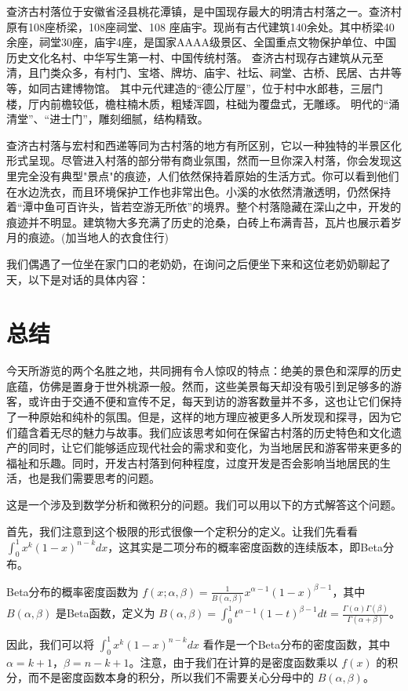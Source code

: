 \documentclass[a4paper,11pt,UTF8]{article}
\begin{document}
查济古村落位于安徽省泾县桃花潭镇，是中国现存最大的明清古村落之一。查济村原有108座桥梁，108座祠堂、108 座庙宇。现尚有古代建筑140余处。其中桥梁40余座，祠堂30座，庙宇4座，是国家AAAA级景区、全国重点文物保护单位、中国历史文化名村、中华写生第一村、中国传统村落。 查济古村现存古建筑从元至清，且门类众多，有村门、宝塔、牌坊、庙宇、社坛、祠堂、古桥、民居、古井等等，如同古建博物馆。 其中元代建造的“德公厅屋”，位于村中水郎巷，三层门楼，厅内前檐较低，檐柱楠木质，粗矮浑圆，柱础为覆盘式，无雕琢。 明代的“涌清堂”、“进士门”，雕刻细腻，结构精致。

查济古村落与宏村和西递等同为古村落的地方有所区别，它以一种独特的半景区化形式呈现。尽管进入村落的部分带有商业氛围，然而一旦你深入村落，你会发现这里完全没有典型"景点"的痕迹，人们依然保持着原始的生活方式。你可以看到他们在水边洗衣，而且环境保护工作也非常出色。小溪的水依然清澈透明，仍然保持着“潭中鱼可百许头，皆若空游无所依”的境界。整个村落隐藏在深山之中，开发的痕迹并不明显。建筑物大多充满了历史的沧桑，白砖上布满青苔，瓦片也展示着岁月的痕迹。(加当地人的衣食住行)

我们偶遇了一位坐在家门口的老奶奶，在询问之后便坐下来和这位老奶奶聊起了天，以下是对话的具体内容：

\section{总结}
今天所游览的两个名胜之地，共同拥有令人惊叹的特点：绝美的景色和深厚的历史底蕴，仿佛是置身于世外桃源一般。然而，这些美景每天却没有吸引到足够多的游客，或许由于交通不便和宣传不足，每天到访的游客数量并不多，这也让它们保持了一种原始和纯朴的氛围。但是，这样的地方理应被更多人所发现和探寻，因为它们蕴含着无尽的魅力与故事。我们应该思考如何在保留古村落的历史特色和文化遗产的同时，让它们能够适应现代社会的需求和变化，为当地居民和游客带来更多的福祉和乐趣。同时，开发古村落到何种程度，过度开发是否会影响当地居民的生活，也是我们需要思考的问题。

这是一个涉及到数学分析和微积分的问题。我们可以用以下的方式解答这个问题。

首先，我们注意到这个极限的形式很像一个定积分的定义。让我们先看看$\int_0^1 x^k (1-x)^{n-k} dx$，这其实是二项分布的概率密度函数的连续版本，即Beta分布。

Beta分布的概率密度函数为 $f(x; \alpha, \beta) = \frac{1}{B(\alpha, \beta)} x^{\alpha - 1} (1 - x)^{\beta - 1}$，其中 $B(\alpha, \beta)$ 是Beta函数，定义为 $B(\alpha, \beta) = \int_0^1 t^{\alpha - 1} (1 - t)^{\beta - 1} dt = \frac{\Gamma(\alpha)\Gamma(\beta)}{\Gamma(\alpha + \beta)}$。

因此，我们可以将 $\int_0^1 x^k (1-x)^{n-k} dx$ 看作是一个Beta分布的密度函数，其中 $\alpha = k + 1$，$\beta = n - k + 1$。注意，由于我们在计算的是密度函数乘以 $f(x)$ 的积分，而不是密度函数本身的积分，所以我们不需要关心分母中的 $B(\alpha, \beta)$。
\end{document}
